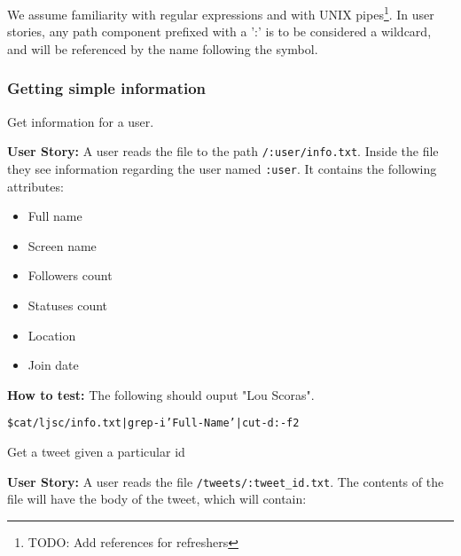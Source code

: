 We assume familiarity with regular expressions and with UNIX
pipes\footnote{TODO: Add references for refreshers}. In user stories, any path
component prefixed with a ':' is to be considered a wildcard, and will be
referenced by the name following the symbol.

\hrulefill

\newenvironment{Requirements}
  {\begin{list}{SR-\arabic{requirements}.}%
               {}}%
  {\end{list}}

\begin{Requirements}

\subsubsection{Getting simple information}
\item Get information for a user.

\textbf{User Story:} A user reads the file to the path \texttt{/:user/info.txt}.
Inside the file they see information regarding the user named \texttt{:user}. It
contains the following attributes:

\begin{itemize}
\item Full name
\item Screen name
\item Followers count
\item Statuses count
\item Location
\item Join date
\end{itemize}

\textbf{How to test:} The following should ouput "Lou Scoras".

\begin{alltt}
    \$ cat /ljsc/info.txt | grep -i 'Full-Name' | cut -d: -f2 
\end{alltt}

\item Get a tweet given a particular id\label{req:get-a-tweet}

\textbf{User Story:} A user reads the file \texttt{/tweets/:tweet\_id.txt}.
The contents of the file will have the body of the tweet, which will contain:


\end{Requirements}
